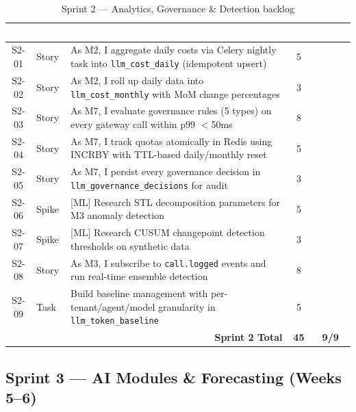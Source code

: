 \documentclass[12pt,a4paper,twoside]{report}
\newcommand{\cmark}{\ding{51}}
\begin{document}
\begin{table}[H]
\centering
\small
\begin{tabularx}{\textwidth}{|c|l|X|c|c|}
\hline
\rowcolor{tabheader}
\textcolor{white}{\textbf{ID}} &
\textcolor{white}{\textbf{Type}} &
\textcolor{white}{\textbf{Story / Task}} &
\textcolor{white}{\textbf{SP}} &
\textcolor{white}{\textbf{Status}} \\
\hline
S2-01 & Story & As M2, I aggregate daily costs via Celery nightly task into \texttt{llm\_cost\_daily} (idempotent upsert) & 5 & \cmark \\
\hline
S2-02 & Story & As M2, I roll up daily data into \texttt{llm\_cost\_monthly} with MoM change percentages & 3 & \cmark \\
\hline
S2-03 & Story & As M7, I evaluate governance rules (5 types) on every gateway call within p99 $<$50ms & 8 & \cmark \\
\hline
S2-04 & Story & As M7, I track quotas atomically in Redis using INCRBY with TTL-based daily/monthly reset & 5 & \cmark \\
\hline
S2-05 & Story & As M7, I persist every governance decision in \texttt{llm\_governance\_decisions} for audit & 3 & \cmark \\
\hline
S2-06 & Spike & \textcolor{accentgreen}{[ML]} Research STL decomposition parameters for M3 anomaly detection & 5 & \cmark \\
\hline
S2-07 & Spike & \textcolor{accentgreen}{[ML]} Research CUSUM changepoint detection thresholds on synthetic data & 3 & \cmark \\
\hline
S2-08 & Story & As M3, I subscribe to \texttt{call.logged} events and run real-time ensemble detection & 8 & \cmark \\
\hline
S2-09 & Task & Build baseline management with per-tenant/agent/model granularity in \texttt{llm\_token\_baseline} & 5 & \cmark \\
\hline
\multicolumn{3}{|r|}{\textbf{Sprint 2 Total}} & \textbf{45} & \textbf{9/9} \\
\hline
\end{tabularx}
\caption{Sprint 2 — Analytics, Governance \& Detection backlog}
\end{table}

\subsection{Sprint 3 — AI Modules \& Forecasting (Weeks 5--6)}
\end{document}
